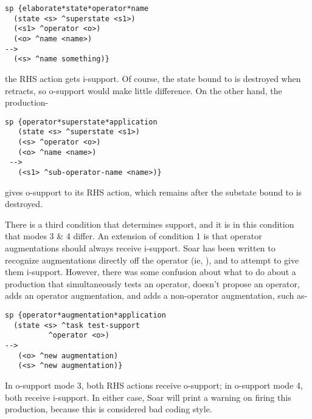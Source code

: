\begin{verbatim}
sp {elaborate*state*operator*name
  (state <s> ^superstate <s1>)
  (<s1> ^operator <o>)
  (<o> ^name <name>)
-->
  (<s> ^name something)}
\end{verbatim}


the RHS action gets i-support. Of course, the state bound to  is destroyed when  retracts, so o-support would make little difference. On the other hand, the production- 

\begin{verbatim}
sp {operator*superstate*application
   (state <s> ^superstate <s1>)
   (<s> ^operator <o>)
   (<o> ^name <name>)
 -->
   (<s1> ^sub-operator-name <name>)}
\end{verbatim}

gives o-support to its RHS action, which remains after the substate bound to  is destroyed. 


There is a third condition that determines support, and it is in this condition that modes 3 \& 4 differ. An extension of condition 1 is that operator augmentations should always receive i-support. Soar has been written to recognize augmentations directly off the operator (ie, ), and to attempt to give them i-support. However, there was some confusion about what to do about a production that simultaneously tests an operator, doesn't propose an operator, adds an operator augmentation, and adds a non-operator augmentation, such as-

\begin{verbatim}
sp {operator*augmentation*application
  (state <s> ^task test-support
  	      ^operator <o>)
-->
   (<o> ^new augmentation)
   (<s> ^new augmentation)}
\end{verbatim}


In o-support mode 3, both RHS actions receive o-support; in o-support mode 4, both receive i-support. In either case, Soar will print a warning on firing this production, because this is considered bad coding style.

